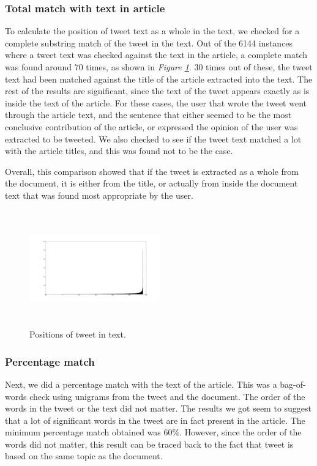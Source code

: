 \documentclass[11pt]{article}
\newcommand{\figref}[1]{\textit{Figure \ref{#1}}}
\begin{document}
\subsubsection {Total match with text in article}

To calculate the position of tweet text as a whole in the text, we checked for a complete substring match of the tweet in the text. Out of the 6144 instances where a tweet text was checked against the text in the article, a complete match was found around 70 times, as shown in \figref{fig:positions}. 30 times out of these, the tweet text had been matched against the title of the article extracted into the text. The rest of the results are significant, since the text of the tweet appears exactly as is inside the text of the article. For these cases, the user that wrote the tweet went through the article text, and the sentence that either seemed to be the most conclusive contribution of the article, or expressed the opinion of the user was extracted to be tweeted. We also checked to see if the tweet text matched a lot with the article titles, and this was found not to be the case. 

Overall, this comparison showed that if the tweet is extracted as a whole from the document, it is either from the title, or actually from inside the document text that was found most appropriate by the user. 

\begin{figure}[htbp]
\centering
\includegraphics[width=0.5\textwidth, height=5cm]{positions}
\caption{Positions of tweet in text.}
\label{fig:positions}
\end{figure}


\subsubsection{Percentage match}

Next, we did a percentage match with the text of the article. This was a bag-of-words check using unigrams from the tweet and the document. The order of the words in the tweet or the text did not matter. The results we got seem to suggest that a lot of significant words in the tweet are in fact present in the article. The minimum percentage match obtained was 60\%. However, since the order of the words did not matter, this result can  be traced back to the fact that tweet is based on the same topic as the document. 
\end{document}
